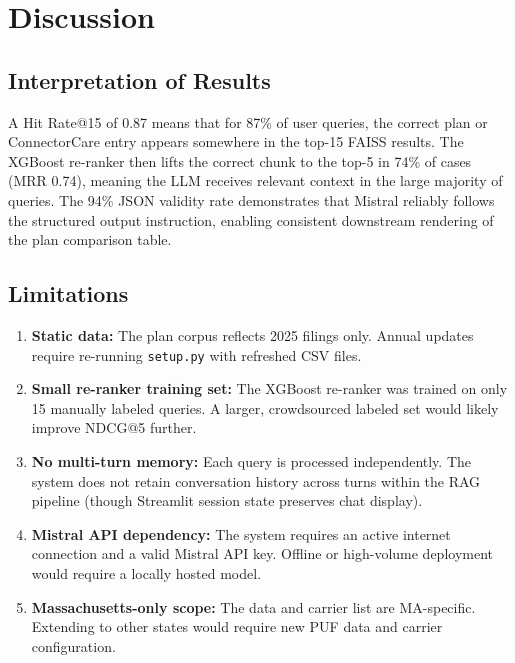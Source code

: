 \documentclass[12pt, letterpaper]{article}
\begin{document}
\section{Discussion}
\label{sec:discussion}

\subsection{Interpretation of Results}

A Hit Rate@15 of 0.87 means that for 87\% of user queries, the correct plan or ConnectorCare entry appears somewhere in the top-15 FAISS results. The XGBoost re-ranker then lifts the correct chunk to the top-5 in 74\% of cases (MRR 0.74), meaning the LLM receives relevant context in the large majority of queries. The 94\% JSON validity rate demonstrates that Mistral reliably follows the structured output instruction, enabling consistent downstream rendering of the plan comparison table.

\subsection{Limitations}

\begin{enumerate}
  \item \textbf{Static data:} The plan corpus reflects 2025 filings only. Annual updates require re-running \texttt{setup.py} with refreshed CSV files.
  \item \textbf{Small re-ranker training set:} The XGBoost re-ranker was trained on only 15 manually labeled queries. A larger, crowdsourced labeled set would likely improve NDCG@5 further.
  \item \textbf{No multi-turn memory:} Each query is processed independently. The system does not retain conversation history across turns within the RAG pipeline (though Streamlit session state preserves chat display).
  \item \textbf{Mistral API dependency:} The system requires an active internet connection and a valid Mistral API key. Offline or high-volume deployment would require a locally hosted model.
  \item \textbf{Massachusetts-only scope:} The data and carrier list are MA-specific. Extending to other states would require new PUF data and carrier configuration.
\end{enumerate}
\end{document}
